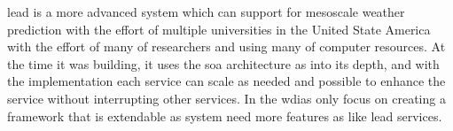 \acrshort{lead} is a more advanced system which can support for mesoscale weather prediction with the effort of multiple universities in the United State America with the effort of many of researchers and using many of computer resources. At the time it was building, it uses the \acrshort{soa} architecture as into its depth, and with the implementation each service can scale as needed and possible to enhance the service without interrupting other services. In the \acrshort{wdias} only focus on creating a framework that is extendable as system need more features as like \acrshort{lead} services.